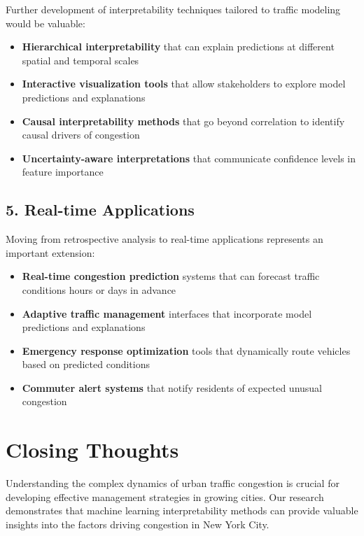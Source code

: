 \documentclass[
  letterpaper,
  DIV=11,
  numbers=noendperiod]{scrreprt}
\providecommand{\tightlist}{%
  \setlength{\itemsep}{0pt}\setlength{\parskip}{0pt}}\usepackage{longtable,booktabs,array}
\begin{document}
Further development of interpretability techniques tailored to traffic
modeling would be valuable:

\begin{itemize}
\tightlist
\item
  \textbf{Hierarchical interpretability} that can explain predictions at
  different spatial and temporal scales
\item
  \textbf{Interactive visualization tools} that allow stakeholders to
  explore model predictions and explanations
\item
  \textbf{Causal interpretability methods} that go beyond correlation to
  identify causal drivers of congestion
\item
  \textbf{Uncertainty-aware interpretations} that communicate confidence
  levels in feature importance
\end{itemize}

\subsection{5. Real-time Applications}\label{real-time-applications}

Moving from retrospective analysis to real-time applications represents
an important extension:

\begin{itemize}
\tightlist
\item
  \textbf{Real-time congestion prediction} systems that can forecast
  traffic conditions hours or days in advance
\item
  \textbf{Adaptive traffic management} interfaces that incorporate model
  predictions and explanations
\item
  \textbf{Emergency response optimization} tools that dynamically route
  vehicles based on predicted conditions
\item
  \textbf{Commuter alert systems} that notify residents of expected
  unusual congestion
\end{itemize}

\section{Closing Thoughts}\label{closing-thoughts}

Understanding the complex dynamics of urban traffic congestion is
crucial for developing effective management strategies in growing
cities. Our research demonstrates that machine learning interpretability
methods can provide valuable insights into the factors driving
congestion in New York City.
\end{document}
